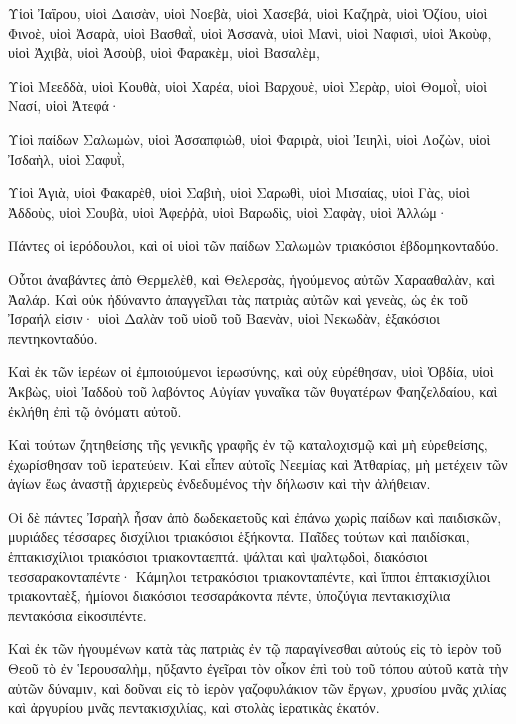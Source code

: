 {\par }{\PP {}Υἱοὶ Ἰαΐρου, υἱοὶ Δαισὰν, υἱοὶ Νοεβὰ, υἱοὶ Χασεβά, υἱοὶ Καζηρὰ, υἱοὶ Ὀζίου, υἱοὶ Φινοὲ, υἱοὶ Ἀσαρὰ, υἱοὶ Βασθαῒ, υἱοὶ Ἀσσανὰ, υἱοὶ Μανὶ, υἱοὶ Ναφισὶ, υἱοὶ Ἀκοὺφ, υἱοὶ Ἀχιβὰ, υἱοὶ Ἀσοὺβ, υἱοὶ Φαρακὲμ, υἱοὶ Βασαλὲμ,
\par }{\PP {}Υἱοὶ Μεεδδὰ, υἱοὶ Κουθὰ, υἱοὶ Χαρέα, υἱοὶ Βαρχουὲ, υἱοὶ Σερὰρ, υἱοὶ Θομοῒ, υἱοὶ Νασί, υἱοὶ Ἀτεφά·
\par }{\PP {}Υἱοὶ παίδων Σαλωμὼν, υἱοὶ Ἀσσαπφιὼθ, υἱοὶ Φαριρὰ, υἱοὶ Ἰειηλὶ, υἱοὶ Λοζὼν, υἱοὶ Ἰσδαὴλ, υἱοὶ Σαφυῒ,
\par }{\PP {}Υἱοὶ Ἁγιὰ, υἱοὶ Φακαρὲθ, υἱοὶ Σαβιὴ, υἱοὶ Σαρωθὶ, υἱοὶ Μισαίας, υἱοὶ Γὰς, υἱοὶ Ἀδδοὺς, υἱοὶ Σουβὰ, υἱοὶ Ἀφεῤῥὰ, υἱοὶ Βαρωδὶς, υἱοὶ Σαφὰγ, υἱοὶ Ἀλλώμ·
\par }{\PP {}Πάντες οἱ ἱερόδουλοι, καὶ οἱ υἱοὶ τῶν παίδων Σαλωμὼν τριακόσιοι ἑβδομηκονταδύο.
\par }{\PP {}Οὗτοι ἀναβάντες ἀπὸ Θερμελὲθ, καὶ Θελερσὰς, ἡγούμενος αὐτῶν Χαρααθαλὰν, καὶ Ἀαλάρ.
Καὶ οὐκ ἠδύναντο ἀπαγγεῖλαι τὰς πατριὰς αὐτῶν καὶ γενεὰς, ὡς ἐκ τοῦ Ἰσραήλ εἰσιν· υἱοὶ Δαλὰν τοῦ υἱοῦ τοῦ Βαενὰν, υἱοὶ Νεκωδὰν, ἑξακόσιοι πεντηκονταδύο.
\par }{\PP {}Καὶ ἐκ τῶν ἱερέων οἱ ἐμποιούμενοι ἱερωσύνης, καὶ οὐχ εὑρέθησαν, υἱοὶ Ὀβδία, υἱοὶ Ἁκβὼς, υἱοὶ Ἰαδδοὺ τοῦ λαβόντος Αὐγίαν γυναῖκα τῶν θυγατέρων Φαηζελδαίου, καὶ ἐκλήθη ἐπὶ τῷ ὀνόματι αὐτοῦ.
\par }{\PP {}Καὶ τούτων ζητηθείσης τῆς γενικῆς γραφῆς ἐν τῷ καταλοχισμῷ καὶ μὴ εὑρεθείσης, ἐχωρίσθησαν τοῦ ἱερατεύειν.
Καὶ εἶπεν αὐτοῖς Νεεμίας καὶ Ἀτθαρίας, μὴ μετέχειν τῶν ἁγίων ἕως ἀναστῇ ἀρχιερεὺς ἐνδεδυμένος τὴν δήλωσιν καὶ τὴν ἀλήθειαν.
\par }{\PP {}Οἱ δὲ πάντες Ἰσραὴλ ἦσαν ἀπὸ δωδεκαετοῦς καὶ ἐπάνω χωρὶς παίδων καὶ παιδισκῶν, μυριάδες τέσσαρες δισχίλιοι τριακόσιοι ἑξήκοντα.
Παῖδες τούτων καὶ παιδίσκαι, ἑπτακισχίλιοι τριακόσιοι τριακονταεπτά. ψάλται καὶ ψαλτῳδοὶ, διακόσιοι τεσσαρακονταπέντε·
Κάμηλοι τετρακόσιοι τριακονταπέντε, καὶ ἵπποι ἑπτακισχίλιοι τριακονταὲξ, ἡμίονοι διακόσιοι τεσσαράκοντα πέντε, ὑποζύγια πεντακισχίλια πεντακόσια εἰκοσιπέντε.
\par }{\PP {}Καὶ ἐκ τῶν ἡγουμένων κατὰ τὰς πατριὰς ἐν τῷ παραγίνεσθαι αὐτούς εἰς τὸ ἱερὸν τοῦ Θεοῦ τὸ ἐν Ἱερουσαλὴμ, ηὔξαντο ἐγεῖραι τὸν οἶκον ἐπὶ τοὺ τοῦ τόπου αὐτοῦ κατὰ τὴν αὐτῶν δύναμιν,
καὶ δοῦναι εἰς τὸ ἱερὸν γαζοφυλάκιον τῶν ἔργων, χρυσίου μνᾶς χιλίας καὶ ἀργυρίου μνᾶς πεντακισχιλίας, καὶ στολὰς ἱερατικὰς ἑκατόν.
}
